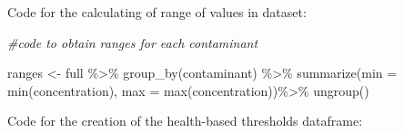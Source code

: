 \documentclass[12pt, twoside]{amherstthesis}
\newenvironment{Shaded}{\begin{snugshade}}{\end{snugshade}}
\newcommand{\AttributeTok}[1]{\textcolor[rgb]{0.77,0.63,0.00}{#1}}
\newcommand{\CommentTok}[1]{\textcolor[rgb]{0.56,0.35,0.01}{\textit{#1}}}
\newcommand{\FunctionTok}[1]{\textcolor[rgb]{0.00,0.00,0.00}{#1}}
\newcommand{\NormalTok}[1]{#1}
\newcommand{\OtherTok}[1]{\textcolor[rgb]{0.56,0.35,0.01}{#1}}
\newcommand{\SpecialCharTok}[1]{\textcolor[rgb]{0.00,0.00,0.00}{#1}}
\begin{document}
Code for the calculating of range of values in dataset:
\begin{Shaded}
\begin{Highlighting}[]
\CommentTok{\#code to obtain ranges for each contaminant}

\NormalTok{ranges }\OtherTok{\textless{}{-}}\NormalTok{ full }\SpecialCharTok{\%\textgreater{}\%}
  \FunctionTok{group\_by}\NormalTok{(contaminant) }\SpecialCharTok{\%\textgreater{}\%}
  \FunctionTok{summarize}\NormalTok{(}\AttributeTok{min =} \FunctionTok{min}\NormalTok{(concentration),}
            \AttributeTok{max =} \FunctionTok{max}\NormalTok{(concentration))}\SpecialCharTok{\%\textgreater{}\%}
  \FunctionTok{ungroup}\NormalTok{()}
\end{Highlighting}
\end{Shaded}
Code for the creation of the health-based thresholds dataframe:
\end{document}
